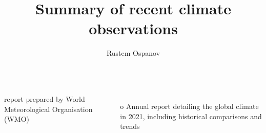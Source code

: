 \documentclass[9pt,handout,aspectratio=169]{beamer}
\title{Summary of recent climate observations}
\author{Rustem Ospanov}
\institute{USTC}
\begin{document}
\begin{frame}
  \begin{small}
              
  \begin{columns}
   report prepared by World Meteorological Organisation (WMO)
    \begin{itemize}\setlength\itemsep{2.0ex}\footnotesize
      \item[o] Annual report detailing the global climate in 2021, including historical comparisons and trends
    \end{itemize}
  \end{columns}

  \end{small}
  \end{frame}
\end{document}
